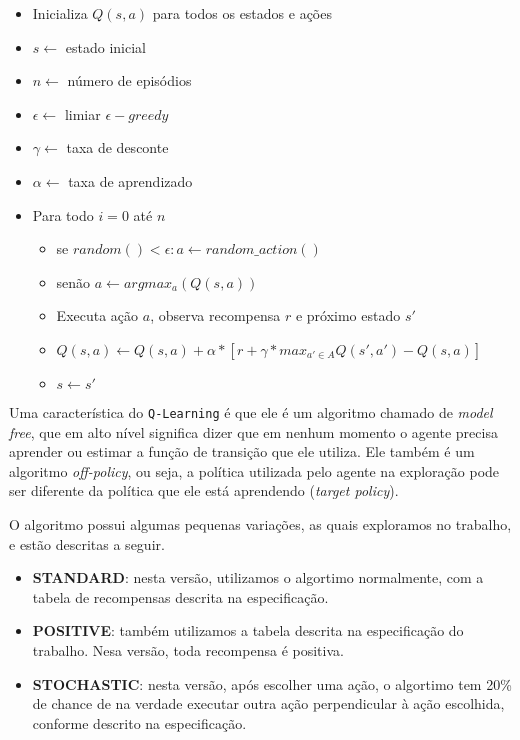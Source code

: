 \documentclass{article}
\begin{document}
\begin{itemize}
	\item Inicializa \(Q(s, a)\) para todos os estados e ações
	\item \(s \gets\) estado inicial
	\item \(n \gets\) número de episódios
	\item \(\epsilon \gets\) limiar \(\epsilon-greedy\)
	\item \(\gamma \gets\) taxa de desconte
	\item \(\alpha \gets\) taxa de aprendizado
	\item Para todo \(i = 0\) até \(n\)
	      \begin{itemize}
		      \item se \(random() < \epsilon: a \gets random\_action()\)
		      \item senão \(a \gets argmax_a(Q(s, a))\)
		      \item Executa ação \(a\), observa recompensa \(r\) e próximo estado \(s'\)
		      \item \(Q(s, a) \gets Q(s, a) + \alpha * [r + \gamma* max_{a' \in A}Q(s', a') - Q(s, a)]\)
		      \item \(s \gets s'\)
	      \end{itemize}
\end{itemize}

Uma característica do \texttt{Q-Learning} é que ele é um algoritmo chamado de \textit{model free}, que em alto nível significa dizer que em nenhum momento o agente
precisa aprender ou estimar a função de transição que ele utiliza. Ele também é um algoritmo \textit{off-policy}, ou seja, a política utilizada pelo agente
na exploração pode ser diferente da política que ele está aprendendo (\textit{target policy}).

O algoritmo possui algumas pequenas variações, as quais exploramos no trabalho, e estão descritas a seguir.

\begin{itemize}
	\item \textbf{STANDARD}: nesta versão, utilizamos o algortimo normalmente, com a tabela de recompensas descrita na especificação.
	\item \textbf{POSITIVE}: também utilizamos a tabela descrita na especificação do trabalho. Nesa versão, toda recompensa é positiva.
	\item \textbf{STOCHASTIC}: nesta versão, após escolher uma ação, o algortimo tem 20\% de chance de na verdade executar outra ação perpendicular à ação escolhida,
	      conforme descrito na especificação.
\end{itemize}
\end{document}
